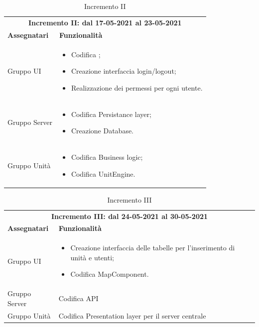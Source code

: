  \begin{table} [h!]
 	\begin{center}
 		\begin{tabular} { m{4cm}  m{11cm}  }	
 			\multicolumn{2}{c}{	\textbf{Incremento II: dal 17-05-2021 al 23-05-2021}} \\
 			\rowcolor{lightgray}
 			\textbf{Assegnatari} & \textbf{Funzionalità} \\
 			Gruppo UI & \begin{itemize}
 				\item Codifica \glock{WebSocket};
 				\item Creazione interfaccia login/logout;
 				\item Realizzazione dei permessi per ogni utente.
 			\end{itemize}\\		
 			Gruppo Server & \begin{itemize}
 				\item Codifica Persistance layer;
 				\item Creazione Database.
 			\end{itemize}\\		
 			Gruppo Unità & \begin{itemize}
 				\item Codifica Business logic;
 				\item Codifica UnitEngine.
 			\end{itemize}\\		
 		\end{tabular}
 		\caption{Incremento II}
 	\end{center}
 \end{table}

 \begin{table} [h!]
	\begin{center}
		\begin{tabular} { m{4cm}  m{11cm}  }	
			\multicolumn{2}{c}{	\textbf{Incremento III: dal 24-05-2021 al 30-05-2021}} \\
			\rowcolor{lightgray}
			\textbf{Assegnatari} & \textbf{Funzionalità} \\
			Gruppo UI & \begin{itemize}
				\item Creazione interfaccia delle tabelle per l'inserimento di unità e utenti;
				\item Codifica MapComponent.
			\end{itemize}\\		
			Gruppo Server & Codifica API\\
			Gruppo Unità & Codifica Presentation layer per il server centrale
		
		\end{tabular}
		\caption{Incremento III}
	\end{center}
\end{table}


